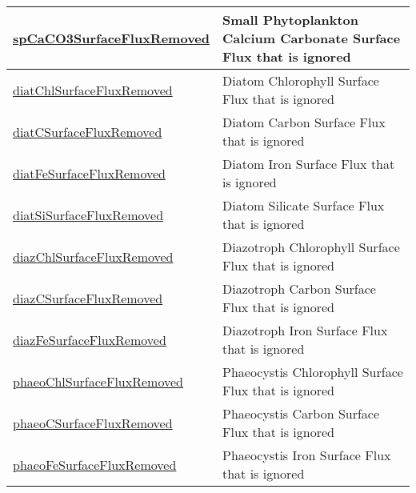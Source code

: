 {\begin{center}
\begin{longtable}{| p{2.0in} | p{4.0in} |}
    \hline
    \hyperref[subsec:var_sec_tracersSurfaceFlux_spCaCO3SurfaceFluxRemoved]{spCaCO3SurfaceFluxRemoved} & Small Phytoplankton Calcium Carbonate Surface Flux that is ignored \\
    \hline
    \hyperref[subsec:var_sec_tracersSurfaceFlux_diatChlSurfaceFluxRemoved]{diatChlSurfaceFluxRemoved} & Diatom Chlorophyll Surface Flux that is ignored \\
    \hline
    \hyperref[subsec:var_sec_tracersSurfaceFlux_diatCSurfaceFluxRemoved]{diatCSurfaceFluxRemoved} & Diatom Carbon Surface Flux that is ignored \\
    \hline
    \hyperref[subsec:var_sec_tracersSurfaceFlux_diatFeSurfaceFluxRemoved]{diatFeSurfaceFluxRemoved} & Diatom Iron Surface Flux that is ignored \\
    \hline
    \hyperref[subsec:var_sec_tracersSurfaceFlux_diatSiSurfaceFluxRemoved]{diatSiSurfaceFluxRemoved} & Diatom Silicate Surface Flux that is ignored \\
    \hline
    \hyperref[subsec:var_sec_tracersSurfaceFlux_diazChlSurfaceFluxRemoved]{diazChlSurfaceFluxRemoved} & Diazotroph Chlorophyll Surface Flux that is ignored \\
    \hline
    \hyperref[subsec:var_sec_tracersSurfaceFlux_diazCSurfaceFluxRemoved]{diazCSurfaceFluxRemoved} & Diazotroph Carbon Surface Flux that is ignored \\
    \hline
    \hyperref[subsec:var_sec_tracersSurfaceFlux_diazFeSurfaceFluxRemoved]{diazFeSurfaceFluxRemoved} & Diazotroph Iron Surface Flux that is ignored \\
    \hline
    \hyperref[subsec:var_sec_tracersSurfaceFlux_phaeoChlSurfaceFluxRemoved]{phaeoChlSurfaceFluxRemoved} & Phaeocystis Chlorophyll Surface Flux that is ignored \\
    \hline
    \hyperref[subsec:var_sec_tracersSurfaceFlux_phaeoCSurfaceFluxRemoved]{phaeoCSurfaceFluxRemoved} & Phaeocystis Carbon Surface Flux that is ignored \\
    \hline
    \hyperref[subsec:var_sec_tracersSurfaceFlux_phaeoFeSurfaceFluxRemoved]{phaeoFeSurfaceFluxRemoved} & Phaeocystis Iron Surface Flux that is ignored \\
    \hline
\end{longtable}
\end{center}
}
